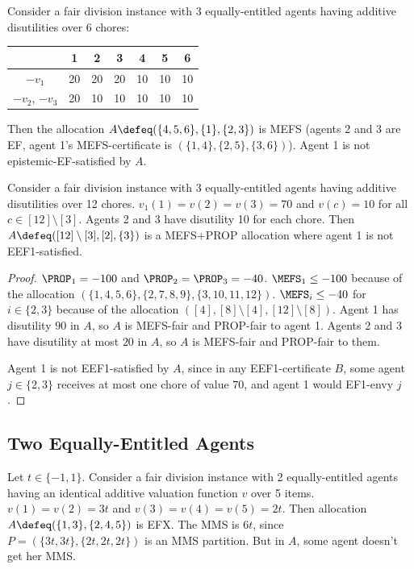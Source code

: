 \begin{example}
\label{cex:mefs-not-eef-chores}
Consider a fair division instance with 3 equally-entitled agents
having additive disutilities over 6 chores:

\begin{tabular}{c|cccccc}
& 1 & 2 & 3 & 4 & 5 & 6
\\ \hline $-v_1$ & 20 & 20 & 20 & 10 & 10 & 10
\\ $-v_2$, $-v_3$ & 20 & 10 & 10 & 10 & 10 & 10
\end{tabular}

Then the allocation $A \defeq (\{4, 5, 6\}, \{1\}, \{2, 3\})$ is MEFS
(agents 2 and 3 are EF, agent 1's MEFS-certificate is $(\{1, 4\}, \{2, 5\}, \{3, 6\})$).
Agent 1 is not epistemic-EF-satisfied by $A$.
\end{example}

\begin{lemma}
\label{cex:mefs-not-eef1-chores}
Consider a fair division instance with 3 equally-entitled agents
having additive disutilities over 12 chores.
$v_1(1) = v(2) = v(3) = 70$ and $v(c) = 10$ for all $c \in [12] \setminus [3]$.
Agents 2 and 3 have disutility 10 for each chore.
Then $A \defeq ([12] \setminus [3], [2], \{3\})$ is a MEFS+PROP allocation
where agent 1 is not EEF1-satisfied.
\end{lemma}
\begin{proof}
$\PROP_1 = -100$ and $\PROP_2 = \PROP_3 = -40$.
$\MEFS_1 \le -100$ because of the allocation $(\{1, 4, 5, 6\}, \{2, 7, 8, 9\}, \{3, 10, 11, 12\})$.
$\MEFS_i \le -40$ for $i \in \{2, 3\}$ because of the allocation
$([4], [8] \setminus [4], [12] \setminus [8])$.
Agent 1 has disutility $90$ in $A$, so $A$ is MEFS-fair and PROP-fair to agent 1.
Agents 2 and 3 have disutility at most $20$ in $A$, so $A$ is MEFS-fair and PROP-fair to them.

Agent 1 is not EEF1-satisfied by $A$, since in any EEF1-certificate $B$,
some agent $j \in \{2, 3\}$ receives at most one chore of value $70$,
and agent 1 would EF1-envy $j$.
\end{proof}

\subsection{Two Equally-Entitled Agents}
\label{sec:cex-extra:2-eqEnt}

\begin{example}
\label{cex:efx-not-mms}
Let $t \in \{-1, 1\}$.
Consider a fair division instance with 2 equally-entitled agents having
an identical additive valuation function $v$ over 5 items.
$v(1) = v(2) = 3t$ and $v(3) = v(4) = v(5) = 2t$.
Then allocation $A \defeq (\{1, 3\}, \{2, 4, 5\})$ is EFX.
The MMS is $6t$, since $P = (\{3t, 3t\}, \{2t, 2t, 2t\})$ is an MMS partition.
But in $A$, some agent doesn't get her MMS.
\end{example}


